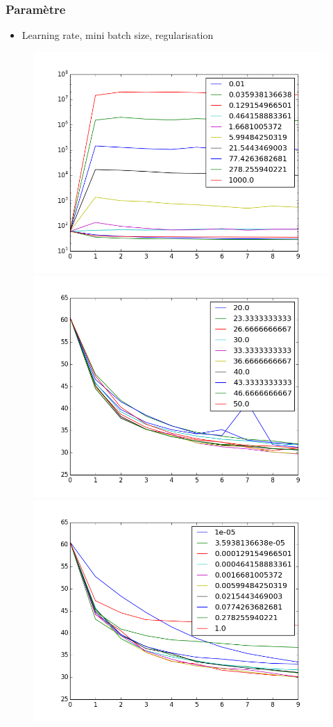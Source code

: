 \documentclass{beamer}
\begin{document}
\begin{frame}
\frametitle{Paramètre}
\begin{itemize}
\item Learning rate, mini batch size, regularisation
\end{itemize}
\begin{figure}[htp]
\centering
\includegraphics[scale=0.2]{fig/lr_curves.png}
\includegraphics[scale=0.2]{fig/mb_curves.png}
\includegraphics[scale=0.2]{fig/reg_curves.png}

\end{figure}
\end{frame}
\end{document}
